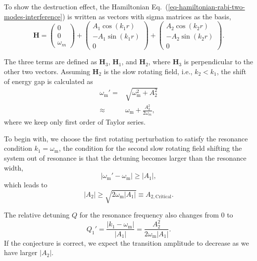 \documentclass[%
reprint,
 amsmath,amssymb,
 aps,
]{revtex4-1}
\begin{document}
To show the destruction effect, the Hamiltonian Eq.~(\ref{eq-hamiltonian-rabi-two-modes-interference}) is written as vectors with sigma matrices as the basis,
\begin{equation}
\mathbf H = \begin{pmatrix}
0\\
0\\
\omega_m
\end{pmatrix} + \begin{pmatrix}
A_1 \cos (k_1 r)\\
-A_1 \sin (k_1 r)\\
0
\end{pmatrix} + \begin{pmatrix}
A_2 \cos (k_2 r)\\
-A_2 \sin (k_2 r)\\
0
\end{pmatrix}.
\end{equation}

The three terms are defined as $\mathbf  H_3$, $\mathbf H_1$, and $\mathbf H_2$, where $\mathbf H_3$ is perpendicular to the other two vectors. Assuming $\mathbf H_2$ is the slow rotating field, i.e., $k_2<k_1$, the shift of energy gap is calculated as
\begin{align}
    \omega_{\mathrm{m}}' =& \sqrt{\omega_{\mathrm{m}}^2 + A_2^2 } \\
    \approx & \omega_{\mathrm{m}} + \frac{A_2^2}{2\omega_{m}},
\end{align}
where we keep only first order of Taylor series.
    
To begin with, we choose the first rotating perturbation to satisfy the resonance condition $k_1=\omega_{\mathrm{m}}$, the condition for the second slow rotating field shifting the system out of resonance is that the detuning becomes larger than the resonance width,
\begin{equation}
\lvert \omega_{\mathrm{m}}' - \omega_{\mathrm{m}} \rvert \geq \lvert A_1 \rvert,
\end{equation}
which leads to
\begin{equation}
\lvert A_2 \rvert \geq \sqrt{2\omega_{\mathrm{m}} \lvert A_1 \rvert} \equiv A_{2,\mathrm{Critical}}.
\end{equation}

The relative detuning $Q$ for the resonance frequency also changes from 0 to
\begin{equation}
    Q_1' = \frac{\lvert k_1 - \omega_{\mathrm{m}} \rvert }{ \lvert A_1 \rvert } = \frac{A_2^2}{2\omega_{\mathrm{m}} \lvert A_1 \rvert }.
    \label{eq-new-q-value-by-adding-new-long-wavelength-mode}
\end{equation}
If the conjecture is correct, we expect the transition amplitude to decrease as we have larger $\lvert A_2\rvert$.
\end{document}
